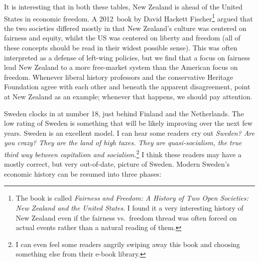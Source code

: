 It is interesting that in both these tables, New Zealand is ahead of the United
States in economic freedom. A 2012~book by David Hackett Fischer\footnote{The
book is called \emph{Fairness and Freedom: A History of Two Open Societies: New
Zealand and the United States}. I found it a very interesting history of New
Zealand even if the fairness vs.\ freedom thread was often forced on actual
events rather than a natural reading of them.} argued that the two societies
differed mostly in that New Zealand's culture was centered on fairness and
equity, whilst the US was centered on liberty and freedom (all of these
concepts should be read in their widest possible sense). This was often
interpreted as a defense of left-wing policies, but we find that a focus on
fairness lead New Zealand to a more free-market system than the American focus
on freedom. Whenever liberal history professors and the conservative Heritage
Foundation agree with each other and beneath the apparent disagreement, point
at New Zealand as an example; whenever that happens, we should pay attention.

Sweden clocks in at number 18, just behind Finland and the Netherlands. The low
rating of Sweden is something that will be likely improving over the next few
years. Sweden is an excellent model. I can hear some readers cry out
\emph{Sweden? Are you crazy? They are the land of high taxes. They are
quasi-socialism, the true third way between capitalism and
socialism.}\footnote{I can even feel some readers angrily swiping away this
book and choosing something else from their e-book library.} I think these
readers may have a mostly correct, but very out-of-date, picture of Sweden.
Modern Sweden's economic history can be resumed into three phases:

